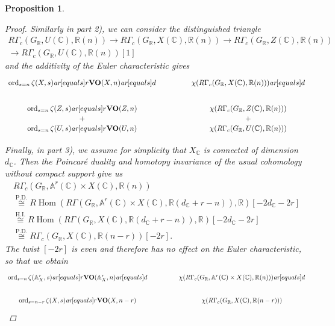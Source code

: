 \documentclass[10pt,a4paper,oneside]{article}
\DeclareMathOperator{\Hom}{Hom}
\DeclareMathOperator{\ord}{ord}
\newcommand{\CC}{\mathbb{C}}
\newcommand{\RR}{\mathbb{R}}
\renewcommand{\AA}{\mathbb{A}}
\newcommand{\ar}{\text{\it ar}}
\newcommand{\RHom}{R\!\Hom}
\theoremstyle{myplain}
\newtheorem{proposition}[theorem]{Proposition}
\theoremstyle{mydefinition}
\numberwithin{equation}{section}
\begin{document}
\begin{proposition}
\begin{proof}
    Similarly in part 2), we can consider the distinguished triangle
    \begin{multline*}
      R\Gamma_c (G_\RR, U (\CC), \RR (n)) \to
      R\Gamma_c (G_\RR, X (\CC), \RR (n)) \to
      R\Gamma_c (G_\RR, Z (\CC), \RR (n)) \\
      \to R\Gamma_c (G_\RR, U (\CC), \RR (n)) [1]
  \end{multline*}
  and the additivity of the Euler characteristic gives
  \[ \begin{tikzcd}[column sep=4em]
      \ord_{s=n} \zeta (X,s) \ar[equals]{r}{\mathbf{VO} (X,n)}\ar[equals]{d} & \chi (R\Gamma_c (G_\RR, X(\CC), \RR (n))) \ar[equals]{d} \\
      \ord_{s=n} \zeta (Z,s) \ar[equals]{r}{\mathbf{VO} (Z,n)} & \chi (R\Gamma_c (G_\RR, Z (\CC), \RR (n))) \\[-2em]
      + & + \\[-2em]
      \ord_{s=n} \zeta (U,s) \ar[equals]{r}{\mathbf{VO} (U,n)} & \chi (R\Gamma_c (G_\RR, U (\CC), \RR (n)))
    \end{tikzcd} \]

  Finally, in part 3), we assume for simplicity that $X_\CC$ is connected of
  dimension $d_\CC$. Then the Poincar\'{e} duality and homotopy invariance of
  the usual cohomology without compact support give us
  \begin{multline*}
    R\Gamma_c (G_\RR, \AA^r (\CC) \times X (\CC), \RR (n)) \\
    \stackrel{\text{P.D.}}{\cong}
    \RHom (R\Gamma (G_\RR, \AA^r (\CC) \times X (\CC), \RR (d_\CC + r - n)), \RR) [-2d_\CC - 2r] \\
    \stackrel{\text{H.I.}}{\cong}
    \RHom (R\Gamma (G_\RR, X (\CC), \RR (d_\CC + r - n)), \RR) [-2d_\CC - 2r] \\
    \stackrel{\text{P.D.}}{\cong}
    R\Gamma_c (G_\RR, X (\CC), \RR (n - r)) [-2r].
  \end{multline*}
  The twist $[-2r]$ is even and therefore has no effect on the Euler
  characteristic, so that we obtain
  \[ \begin{tikzcd}[column sep=4em]
      \ord_{s=n} \zeta (\AA^r_X,s) \ar[equals]{r}{\mathbf{VO} (\AA^r_X,n)}\ar[equals]{d} & \chi (R\Gamma_c (G_\RR, \AA^r (\CC) \times X(\CC), \RR (n))) \ar[equals]{d} \\
      \ord_{s=n-r} \zeta (X,s) \ar[equals]{r}{\mathbf{VO} (X,n-r)} & \chi (R\Gamma_c (G_\RR, X (\CC), \RR (n-r)))
    \end{tikzcd} \]
  \end{proof}
\end{proposition}
\end{document}
